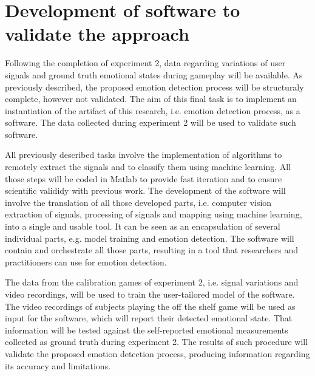 \section{Development of software to validate the approach}

Following the completion of experiment 2, data regarding variations of user signals and ground truth emotional states during gameplay will be available. As previously described, the proposed emotion detection process will be structuraly complete, however not validated. The aim of this final task is to implement an instantiation of the artifact of this research, i.e. emotion detection process, as a software. The data collected during experiment 2 will be used to validate such software.

All previously described tasks involve the implementation of algorithms to remotely extract the signals and to classify them using machine learning. All those steps will be coded in Matlab to provide fast iteration and to ensure scientific valididy with previous work. The development of the software will involve the translation of all those developed parts, i.e. computer vision extraction of signals, processing of signals and mapping using machine learning, into a single and usable tool. It can be seen as an encapsulation of several individual parts, e.g. model training and emotion detection. The software will contain and orchestrate all those parts, resulting in a tool that researchers and practitioners can use for emotion detection.

The data from the calibration games of experiment 2, i.e. signal variations and video recordings, will be used to train the user-tailored model of the software. The video recordings of subjects playing the off the shelf game will be used as input for the software, which will report their detected emotional state. That information will be tested against the self-reported emotional measurements collected as ground truth during experiment 2. The results of such procedure will validate the proposed emotion detection process, producing information regarding its accuracy and limitations.


